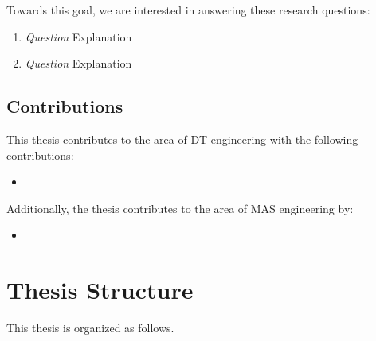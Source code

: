 Towards this goal, we are interested in answering these research questions:

\begin{enumerate}[label=\textbf{RQ\arabic*}]
  \item\label{rq:1}
  \emph{Question}
  \newline
  Explanation
  \item\label{rq:2}
  \emph{Question}
  \newline
  Explanation
\end{enumerate}


\subsection*{Contributions}


This thesis contributes to the area of \ac{DT} engineering with the following contributions:
\begin{itemize}
  \item 
\end{itemize}

Additionally, the thesis contributes to the area of \ac{MAS} engineering by: 
\begin{itemize}
  \item 
\end{itemize}



\section*{Thesis Structure}

This thesis is organized as follows. 
